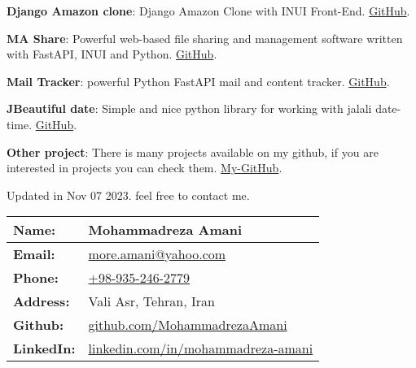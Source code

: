 \documentclass[margin]{res}
\begin{document}
\begin{resume}
\par
\textbf{Django Amazon clone}: 
Django Amazon Clone with INUI Front-End.
\hfill \href{https://github.com/MohammadrezaAmani/Django-Amazon-clone}{GitHub}. 
\par
\textbf{MA Share}: 
Powerful web-based file sharing and management software written with FastAPI, INUI and Python.
\hfill \href{https://github.com/MohammadrezaAmani/Ma-share}{GitHub}.

\par
\textbf{Mail Tracker}: 
powerful Python FastAPI mail and content tracker.
\hfill \href{https://github.com/MohammadrezaAmani/MailTracker}{GitHub}.

\par
\textbf{JBeautiful date}: 
Simple and nice python library for working with jalali date-time.
 \hfill \href{https://github.com/MohammadrezaAmani/Jbeautiful-date}{GitHub}.

\par
\textbf{Other project}: 
There is many projects available on my github, if you are interested in projects you can check them.
 \hfill \href{https://github.com/MohammadrezaAmani/}{My-GitHub}.

Updated in Nov 07 2023. feel free to contact me. 

\begin{tabular}{|p{4cm}|p{6cm}|}
    \hline
    \textbf{Name:} & Mohammadreza Amani \\
    \hline
    \textbf{Email:} & \href{mailto:more.amani@yahoo.com}{more.amani@yahoo.com}\\
    \hline
    \textbf{Phone:} & \href{tel:+989352462779}{+98-935-246-2779} \\
    \hline
    \textbf{Address:} & Vali Asr, Tehran, Iran \\
    \hline
    \textbf{Github:} & \href{https://github.com/MohammadrezaAmani}{github.com/MohammadrezaAmani} \\
    \hline
    \textbf{LinkedIn:} & \href{https://www.linkedin.com/in/mohammadreza-amani/}{linkedin.com/in/mohammadreza-amani}\\ 
    \hline
    \end{tabular}
\end{resume}
\end{document}
